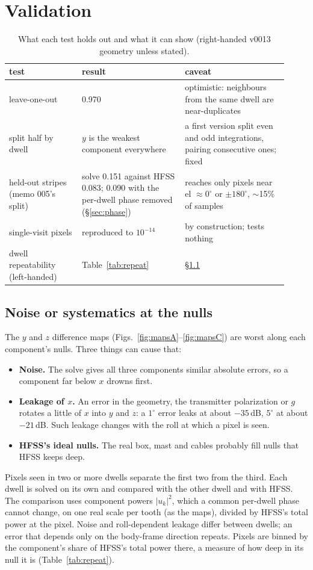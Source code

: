 \documentclass{aastex631}
\begin{document}
\section{Validation} \label{sec:validation}
\begin{table}[h]
\centering
\caption{What each test holds out and what it can show (right-handed v0013 geometry unless stated).}
\label{tab:tests}
\begin{tabular}{p{0.24\linewidth}p{0.34\linewidth}p{0.34\linewidth}}
\hline
test & result & caveat \\
\hline
leave-one-out & 0.970 & optimistic: neighbours from the same dwell are near-duplicates \\
split half by dwell & $y$ is the weakest component everywhere & a first version split even and odd
  integrations, pairing consecutive ones; fixed \\
held-out stripes (memo 005's split) & solve 0.151 against HFSS 0.083; 0.090 with the per-dwell phase removed
  (\S\ref{sec:phase}) & reaches only pixels near el $\approx0^\circ$ or $\pm180^\circ$, $\sim$15\% of samples \\
single-visit pixels & reproduced to $10^{-14}$ & by construction; tests nothing \\
dwell repeatability (left-handed) & Table~\ref{tab:repeat} & \S\ref{sec:nulls} \\
\hline
\end{tabular}
\end{table}

\subsection{Noise or systematics at the nulls} \label{sec:nulls}
The $y$ and $z$ difference maps (Figs.~\ref{fig:mapsA}--\ref{fig:mapsC}) are worst along each component's
nulls. Three things can cause that:
\begin{itemize}
\item \textbf{Noise.} The solve gives all three components similar absolute errors, so a component far below
  $x$ drowns first.
\item \textbf{Leakage of $x$.} An error in the geometry, the transmitter polarization or $g$ rotates a little of
  $x$ into $y$ and $z$: a $1^\circ$ error leaks at about $-35$\,dB, $5^\circ$ at about $-21$\,dB. Such leakage
  changes with the roll at which a pixel is seen.
\item \textbf{HFSS's ideal nulls.} The real box, mast and cables probably fill nulls that HFSS keeps deep.
\end{itemize}
Pixels seen in two or more dwells separate the first two from the third. Each dwell is solved on its own and
compared with the other dwell and with HFSS. The comparison uses component powers $|u_k|^2$, which a common
per-dwell phase cannot change, on one real scale per tooth (as the maps), divided by HFSS's total power at the
pixel. Noise and roll-dependent leakage differ between dwells; an error that depends only on the body-frame
direction repeats. Pixels are binned by the component's share of HFSS's total power there, a measure of how
deep in its null it is (Table~\ref{tab:repeat}).
\end{document}
